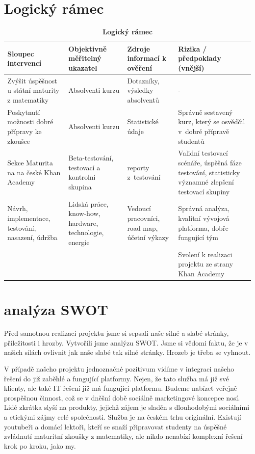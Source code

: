\documentclass[12pt, a4paper]{report}
\begin{document}
\chapter{Logický rámec}
\label{sec:org7f8850c}

\begin{table}[htbp]
\caption{\textbf{Logický rámec}}
\centering
\begin{tabularx}{\textwidth}{XXXX}
Sloupec intervencí & Objektivně měřitelný ukazatel & Zdroje informací k ověření & Rizika / předpoklady (vnější)\\
\hline
Zvýšit úspěšnost u státní maturity z matematiky & Absolventi kurzu & Dotazníky, výsledky absolventů & -\\
\hline
Poskytnutí možnosti dobré přípravy ke zkoušce & Absolventi kurzu & Statistické údaje & Správně sestavený kurz, který se osvědčil v dobré přípravě studentů\\
\hline
Sekce Maturita na na české Khan Academy & Beta-testování, testovací a  kontrolní skupina & reporty z testování & Validní testovací scénáře, úspěšná fáze testování, statisticky významné zlepšení testovací skupiny\\
\hline
Návrh, implementace, testování, nasazení, údržba & Lidská práce, know-how, hardware, technologie, energie & Vedoucí pracovníci, road map, účetní výkazy & Správná analýza, kvalitní vývojová platforma, dobře fungující tým\\
\hline
 &  &  & Svolení k realizaci projektu ze strany Khan Academy\\
\end{tabularx}
\end{table}

\chapter{analýza SWOT}
Před samotnou realizací projektu jsme si sepsali naše silné a slabé stránky, příležitosti i hrozby. Vytvořili jsme analýzu SWOT. Jsme si vědomi faktu, že je v našich silách ovlivnit jak naše slabé tak silné stránky. Hrozeb je třeba se vyhnout.

V případě našeho projektu jednoznačné pozitivum vidíme v integraci našeho řešení do již zaběhlé a fungující platformy. Nejen, že tato služba má již své klienty, ale také IT řešení již má fungující platformu. Budeme nabízet veřejně prospěšnou činnost, což se v dněšní době sociálně marketingové koncepce nosí. Lidé zkrátka slyší na produkty, jejichž zájem je sladěn s dlouhodobými sociálními a etickými zájmy celé společnosti. Služba je na českém trhu originální. Existují youtubeři a domácí lektoři, kteří se snaží připravovat studenty na úspěšné zvládnutí maturitní zkoušky z matematiky, ale nikdo nenabízí komplexní řešení krok po kroku, jako my.
\end{document}

